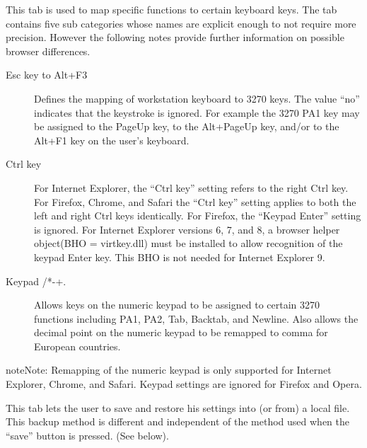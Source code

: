 \documentclass[letterpaper,10pt,english]{sphinxmanual}
\begin{document}



This tab is used to map specific functions to certain keyboard keys. The tab contains five sub categories whose names are explicit enough to not require more precision. However the following notes provide further information on possible browser differences.
\begin{description}
\item[{Esc key to Alt+F3}] \leavevmode
Defines the mapping of workstation keyboard to 3270 keys. The value “no” indicates that the keystroke is ignored. For example the 3270 PA1 key may be assigned to the PageUp key, to the Alt+PageUp key, and/or to the Alt+F1 key on the user’s keyboard.

\item[{Ctrl key}] \leavevmode
For Internet Explorer, the “Ctrl key” setting refers to the right Ctrl key. For Firefox, Chrome, and Safari the “Ctrl key” setting applies to both the left and right Ctrl keys identically. For Firefox, the “Keypad Enter” setting is ignored. For Internet Explorer versions 6, 7, and 8, a browser helper object(BHO = virtkey.dll) must be installed to allow recognition of the keypad Enter key. This BHO is not needed for Internet Explorer 9.

\item[{Keypad /*-+.}] \leavevmode
Allows keys on the numeric keypad to be assigned to certain 3270 functions including PA1, PA2, Tab, Backtab, and Newline. Also allows the decimal point on the numeric keypad to be remapped to comma for European countries.

\end{description}

\begin{sphinxadmonition}{note}{Note:}
Remapping of the numeric keypad is only supported for Internet Explorer, Chrome, and Safari. Keypad settings are ignored for Firefox and Opera.
\end{sphinxadmonition}




This tab lets the user to save and restore his settings into (or from) a local file. This backup method is different and independent of the method used when the “save” button is pressed. (See below).
\end{document}
